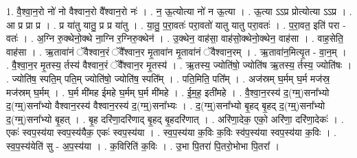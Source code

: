 \documentclass[17pt]{extarticle}
\begin{document}
1. वै॒श्वा॒न॒रो नो॑ नो वैश्वान॒रो वै᳚श्वान॒रो नः॑ । . न॒ ऊ॒त्योत्या नो॑ न ऊ॒त्या । . ऊ॒त्या ऽऽप्र प्रोत्योत्या ऽऽप्र । . आ प्र प्रा प्र । . प्र या॑तु यातु॒ प्र प्र या॑तु । . या॒तु॒ प॒रा॒वतः॑ परा॒वतो॑ यातु यातु परा॒वतः॑ । . प॒रा॒वत॒ इति॑ परा - वतः॑ । . अ॒ग्नि रु॒क्थेनो॒क्थे ना॒ग्नि र॒ग्निरु॒क्थेन॑ । . उ॒क्थेन॒ वाह॑सा॒ वाह॑सो॒क्थेनो॒क्थेन॒ वाह॑सा । . वाह॒सेति॒ वाह॑सा । . ऋ॒तावा॑नं ॅवैश्वान॒रं ॅवै᳚श्वान॒र मृ॒तावा॑न मृ॒तावा॑नं ॅवैश्वान॒रम् । . ऋ॒तावा॑न॒मित्यृ॒त - वा॒न॒म् । . वै॒श्वा॒न॒र मृ॒तस्य॒ र्तस्य॑ वैश्वान॒रं ॅवै᳚श्वान॒र मृ॒तस्य॑ । . ऋ॒तस्य॒ ज्योति॑षो॒ ज्योति॑ष ऋ॒तस्य॒ र्तस्य॒ ज्योति॑षः । . ज्योति॑ष॒ स्पति॒म् पति॒म् ज्योति॑षो॒ ज्योति॑ष॒ स्पति᳚म् । . पति॒मिति॒ पति᳚म् । . अज॑स्रम् घ॒र्मम् घ॒र्म मज॑स्र॒ मज॑स्रम् घ॒र्मम् । . घ॒र्म मी॑मह ईमहे घ॒र्मम् घ॒र्म मी॑महे । . ई॒म॒ह॒ इती॑महे । . वै॒श्वा॒न॒रस्य॑ द॒(ग्म्॒)सना᳚भ्यो द॒(ग्म्॒)सना᳚भ्यो वैश्वान॒रस्य॑ वैश्वान॒रस्य॑ द॒(ग्म्॒)सना᳚भ्यः । . द॒(ग्म्॒)सना᳚भ्यो बृ॒हद् बृ॒हद् द॒(ग्म्॒)सना᳚भ्यो द॒(ग्म्॒)सना᳚भ्यो बृ॒हत् । . बृ॒ह दरि॑णा॒दरि॑णाद् बृ॒हद् बृ॒हदरि॑णात् । . अरि॑णा॒देक॒ एको॒ अरि॑णा॒ दरि॑णा॒देकः॑ । . एकः॑ स्वप॒स्य॑या स्वप॒स्य॑यैक॒ एकः॑ स्वप॒स्य॑या । . स्व॒प॒स्य॑या क॒विः क॒विः स्व॑प॒स्य॑या स्वप॒स्य॑या क॒विः । . स्व॒प॒स्य॑येति॑ सु - अ॒प॒स्य॑या । . क॒विरिति॑ क॒विः । . उ॒भा पि॒तरा॑ पि॒तरो॒भोभा पि॒तरा᳚ । \newline
\end{document}
